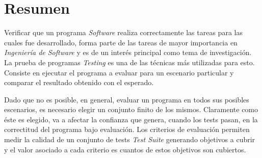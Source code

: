 \chapter*{Resumen}
Verificar que un programa \emph{Software} realiza correctamente las tareas para las cuales fue desarrollado, forma parte de las tareas de mayor importancia en \emph{Ingenier\'ia de Software} y es de un inter\'es principal como tema de investigaci\'on. La prueba de programas \emph{Testing} es una de las t\'ecnicas m\'as utilizadas para esto. Consiste en ejecutar el programa a evaluar para un escenario particular y comparar el resultado obtenido con el esperado.


Dado que no es posible, en general, evaluar un programa en todos sus posibles escenarios, es necesario elegir un conjunto finito de los mismos. Claramente como \'este es elegido, va a afectar la confianza que genera, cuando los tests pasan, en la correctitud del programa bajo evaluaci\'on. Los criterios de evaluaci\'on permiten medir la calidad de un conjunto de tests \emph{Test Suite} generando objetivos a cubrir y el valor asociado a cada criterio es cuantos de estos objetivos son cubiertos.



